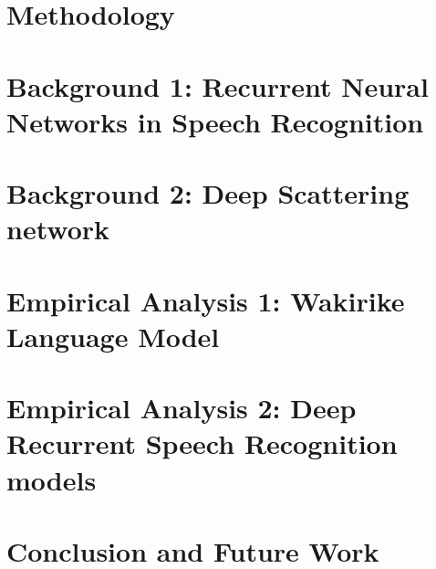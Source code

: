 \documentclass[12pt,twoside]{report}
\begin{document}
\chapter{Methodology}\label{ch3Method}


\chapter{Background 1: Recurrent Neural Networks in Speech Recognition}\label{ch3RNN}


\chapter{Background 2: Deep Scattering network}\label{ch4DSN}


\chapter{Empirical Analysis 1: Wakirike Language Model}\label{ch6_wlm}


\chapter{Empirical Analysis 2: Deep Recurrent Speech Recognition models}\label{ch6_speech}


\chapter{Conclusion and Future Work}\label{ch8_future}

\chapter*{\appendix}
\label{app_haar}
\chapter*{\appendix}

\chapter*{\appendix}

\chapter*{\appendix}
\label{app4_tfcode}

\startblue

\stopblue
\end{document}
